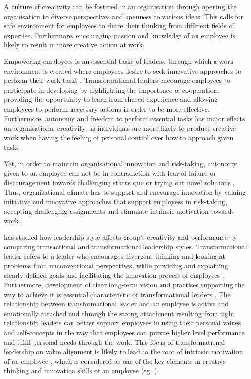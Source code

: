 A culture of creativity can be fostered in an organisation through opening the organisation to diverse perspectives and openness to various ideas. This calls for safe environment for employees to share their thinking from different fields of expertise. Furthermore, encouraging passion and knowledge of an employee is likely to result in more creative action at work. \citep{amabile2008creativity}

Empowering employees is an essential tasks of leaders, through which a work environment is created where employees desire to seek innovative approaches to perform their work tasks \citep{jung2003role}. Transformational leaders encourage employees to participate in developing by highlighting the importance of cooperation, providing the opportunity to learn from shared experience and allowing employees to perform necessary actions in order to be more effective\citep{bass1990implications}. Furthermore, autonomy and freedom to perform essential tasks has major effects on organisational creativity, as individuals are more likely to produce creative work when having the feeling of personal control over how to approach given tasks \citep{amabile1996assessing}.

Yet, in order to maintain organisational innovation and risk-taking, autonomy given to an employee can not be in contradiction with fear of failure or discouragement towards challenging status quo or trying out novel solutions \citep{yukl2002leadership}. Thus, organisational climate has to support and encourage innovation \citep{mumford1988creativity} by valuing initiative and innovative approaches that support employees in risk-taking, accepting challenging assignments and stimulate intrinsic motivation towards work \citep{jung2003role}.

\citep{jung2001transformational} has studied how leadership style affects group's creativity and performance by comparing transactional and transformational leadership styles. Transformational leader refers to a leader who encourages divergent thinking and looking at problems from unconventional perspectives, while providing and explaining clearly defined goals and facilitating the innovation process of employees \citep{bass1990implications}. Furthermore, development of clear long-term vision and practises supporting the way to achieve it is essential characteristic of transformational leaders \citep{avolio1988transformational}. The relationship between transformational leader and an employee is active and emotionally attached \citep{avolio1988transformational} and through the strong attachment resulting from tight relationship leaders can better support employees in using their personal values and self-concepts in the way that employees can pursue higher level performance and fulfil personal needs through the work. This focus of transformational leadership on value alignment is likely to lead to the root of intrinsic motivation of an employee \citep{gardner1998charismatic}, which is considered as one of the key elements in creative thinking and innovation skills of an employee (eg. \citep{jung2001transformational,amabile1998kill,deciintrinsic}).

